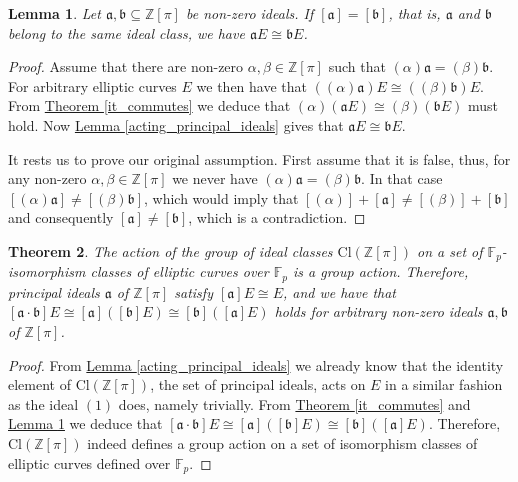 \documentclass[openany, a4paper, 10pt]{book}
\theoremstyle{plain}
\newtheorem{theorem}{Theorem}[chapter]
\theoremstyle{plain}
\theoremstyle{plain}
\newtheorem{lemma}[theorem]{Lemma}
\theoremstyle{definition}
\theoremstyle{plain}
\theoremstyle{definition}
\theoremstyle{remark}
\newcommand{\theoref}[1]{\hyperref[#1]{Theorem \ref{#1}}}
\newcommand{\lemref}[1]{\hyperref[#1]{Lemma \ref{#1}}}
\begin{document}
\begin{lemma}\label{same_class_same_curve}
    Let $\mathfrak a, \mathfrak b \subseteq \mathbb Z[\pi]$ be non-zero ideals.
    If $[\mathfrak a] = [\mathfrak b]$, that is, $\mathfrak a$ and $\mathfrak b$ belong to the same ideal class, we have
    $\mathfrak aE \cong \mathfrak bE$.
\end{lemma}
\begin{proof}
    Assume that there are non-zero $\alpha, \beta \in \mathbb Z[\pi]$ such that $(\alpha)\mathfrak a = (\beta)\mathfrak b$.
    For arbitrary elliptic curves $E$ we then have that
    $((\alpha)\mathfrak a) E \cong ((\beta)\mathfrak b) E$.
    From \theoref{it_commutes} we deduce that
    $(\alpha)(\mathfrak a E) \cong (\beta)(\mathfrak b E)$ must hold.
    Now \lemref{acting_principal_ideals} gives that $\mathfrak aE \cong \mathfrak bE$.

    It rests us to prove our original assumption.
    First assume that it is false, thus, for any non-zero $\alpha, \beta \in \mathbb Z[\pi]$ we never have $(\alpha)\mathfrak a = (\beta)\mathfrak b$.
    In that case $[(\alpha) \mathfrak a] \neq [(\beta) \mathfrak b]$, which would imply that $[(\alpha)] + [\mathfrak a] \neq [(\beta)] + [\mathfrak b]$ and consequently $[\mathfrak a] \neq [\mathfrak b]$, which is a contradiction.
\end{proof}

\begin{theorem}\label{ideal_classes}
    The action of the group of ideal classes $\mathrm{Cl}(\mathbb Z[\pi])$ on a set of $\mathbb F_p$-isomorphism classes of elliptic curves over $\mathbb F_p$ is a group action.
    Therefore, principal ideals $\mathfrak a$ of $\mathbb Z[\pi]$ satisfy $[\mathfrak a]E \cong E$, and we have that $[\mathfrak a \cdot \mathfrak b]E \cong [\mathfrak a] ([\mathfrak b]E) \cong [\mathfrak b]([\mathfrak a] E)$ holds for arbitrary non-zero ideals $\mathfrak a, \mathfrak b$ of $\mathbb Z[\pi]$.
\end{theorem}
\begin{proof}
    From \lemref{acting_principal_ideals} we already know that the identity element of $\mathrm {Cl}(\mathbb Z[\pi])$, the set of principal ideals, acts on $E$ in a similar fashion as the ideal $(1)$ does, namely trivially.
    From \theoref{it_commutes} and \lemref{same_class_same_curve} we deduce that
    $[\mathfrak a \cdot \mathfrak b]E \cong [\mathfrak a] ([\mathfrak b]E) \cong [\mathfrak b]([\mathfrak a] E)$.
    Therefore, $\mathrm {Cl}(\mathbb Z[\pi])$ indeed defines a group action on a set of isomorphism classes of elliptic curves defined over $\mathbb F_p$.
\end{proof}
\end{document}
